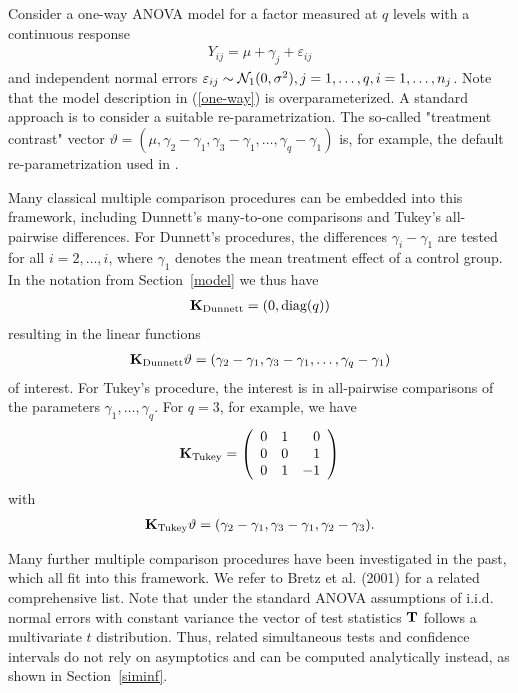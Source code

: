 \documentclass[12pt]{article}
\begin{document}
Consider a one-way ANOVA model for a factor measured at $q$ levels
with a continuous response
\begin{eqnarray}\label{one-way}
Y_{ij} = \mu + \gamma_{j} + \varepsilon_{ij}
\end{eqnarray}
and independent normal errors $\varepsilon_{ij} \sim \mathcal{N}_1(0, \sigma^2), j = 1, \dots, q, i = 1, \dots, n_j$.
Note that the model description in (\ref{one-way}) is overparameterized.
A standard approach is to consider a suitable re-parametrization.
The so-called "treatment contrast" vector
$\vartheta = (\mu, \gamma_2 - \gamma_1, \gamma_3 - \gamma_1, \dots, \gamma_q - \gamma_1)$
is, for example, the default re-parametrization used in \RR.

Many classical multiple comparison procedures can be embedded into this framework,
including Dunnett's many-to-one comparisons and
Tukey's all-pairwise differences. For Dunnett's procedures,
the differences $\gamma_i - \gamma_1$ are tested for all $i=2, \ldots, i$, where $\gamma_1$ denotes the mean treatment effect of a control group.
In the notation from Section~\ref{model} we thus have
\begin{eqnarray*}
\mathbf{K}_\text{Dunnett} = (0, \text{diag}(q))
\end{eqnarray*}
resulting in the linear functions
\begin{eqnarray*}
\mathbf{K}_\text{Dunnett} \vartheta = (\gamma_2 - \gamma_1, \gamma_3 - \gamma_1, \dots, \gamma_q - \gamma_1)
\end{eqnarray*}
of interest.
For Tukey's procedure, the interest is in all-pairwise comparisons of the parameters $\gamma_1, \dots, \gamma_q$. For $q = 3$, for example, we have
\begin{eqnarray*}
\mathbf{K}_\text{Tukey} = \left(
\begin{array}{rrr} 0 & 1 & 0 \\
0 & 0 & 1 \\
0 & 1 & -1
\end{array} \right)
\end{eqnarray*}
with
\begin{eqnarray*}
\mathbf{K}_\text{Tukey} \vartheta = (\gamma_2 - \gamma_1, \gamma_3 - \gamma_1, \gamma_2 - \gamma_3).
\end{eqnarray*}

Many further multiple comparison procedures have been investigated in the past, which all fit into this framework. We refer to Bretz et al. (2001) for a related comprehensive list.
Note that under the standard ANOVA assumptions of i.i.d. normal errors with constant
variance the vector of test statistics $\mathbf{T}$ follows a multivariate $t$ distribution.
Thus, related simultaneous tests and confidence intervals do not rely on asymptotics and can be computed analytically instead, as shown in Section~\ref{siminf}.
\end{document}
